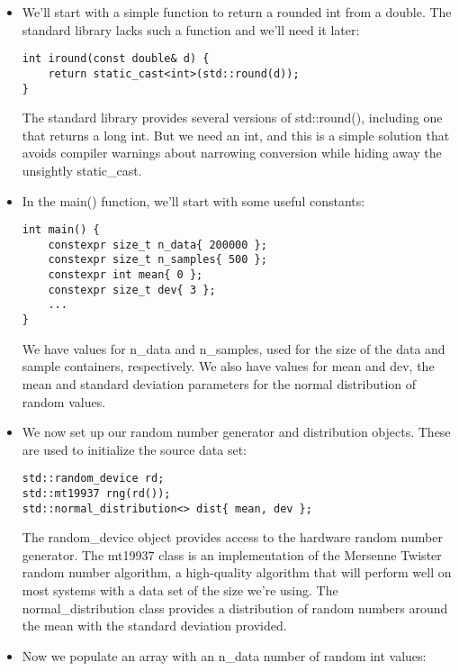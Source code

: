 \begin{itemize}
\item 
We'll start with a simple function to return a rounded int from a double. The standard library lacks such a function and we'll need it later:

\begin{lstlisting}[style=styleCXX]
int iround(const double& d) {
	return static_cast<int>(std::round(d));
}
\end{lstlisting}

The standard library provides several versions of std::round(), including one that returns a long int. But we need an int, and this is a simple solution that avoids compiler warnings about narrowing conversion while hiding away the unsightly static\_cast.

\item 
In the main() function, we'll start with some useful constants:

\begin{lstlisting}[style=styleCXX]
int main() {
	constexpr size_t n_data{ 200000 };
	constexpr size_t n_samples{ 500 };
	constexpr int mean{ 0 };
	constexpr size_t dev{ 3 };
	...
}
\end{lstlisting}

We have values for n\_data and n\_samples, used for the size of the data and sample containers, respectively. We also have values for mean and dev, the mean and standard deviation parameters for the normal distribution of random values.

\item 
We now set up our random number generator and distribution objects. These are used to initialize the source data set:

\begin{lstlisting}[style=styleCXX]
std::random_device rd;
std::mt19937 rng(rd());
std::normal_distribution<> dist{ mean, dev };
\end{lstlisting}

The random\_device object provides access to the hardware random number generator. The mt19937 class is an implementation of the Mersenne Twister random number algorithm, a high-quality algorithm that will perform well on most systems with a data set of the size we're using. The normal\_distribution class provides a distribution of random numbers around the mean with the standard deviation provided.

\item 
Now we populate an array with an n\_data number of random int values:


\end{itemize}
